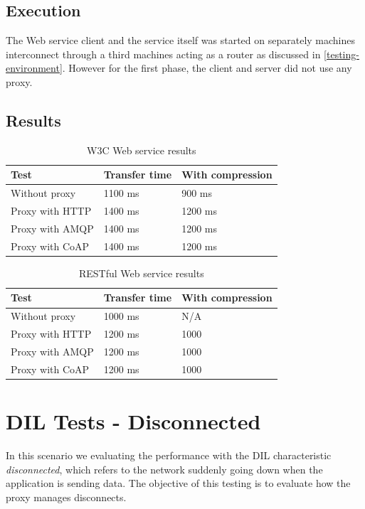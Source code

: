 \subsection{Execution}

The Web service client and the service itself was started on separately machines
interconnect through a third machines acting as a router as discussed in
\cref{testing-environment}. However for the first phase, the client and server
did not use any proxy.


\subsection{Results}

\begin{table}[h!]
\begin{tabular}{| l | l | l |}
\hline
  \textbf{Test} & \textbf{Transfer time} & \textbf{With compression}\\ \hline
  Without proxy & 1100 ms & 900 ms \\ \hline
  Proxy with HTTP & 1400 ms & 1200 ms \\ \hline
  Proxy with AMQP & 1400 ms & 1200 ms \\ \hline
  Proxy with CoAP & 1400 ms & 1200 ms \\ \hline
\end{tabular}
\caption{W3C Web service results}
\end{table}

\begin{table}[h!]
\begin{tabular}{| l | l | l |}
\hline
  \textbf{Test} & \textbf{Transfer time} & \textbf{With compression}\\ \hline
  Without proxy & 1000 ms & N/A \\ \hline
  Proxy with HTTP & 1200 ms & 1000\\ \hline
  Proxy with AMQP & 1200 ms & 1000\\ \hline
  Proxy with CoAP & 1200 ms & 1000\\ \hline
\end{tabular}
\caption{RESTful Web service results}
\end{table}


\section{DIL Tests - Disconnected}

In this scenario we evaluating the performance with the DIL characteristic
\textit{disconnected}, which refers to the network suddenly going down when the
application is sending data. The objective of this testing is to evaluate how
the proxy manages disconnects.

